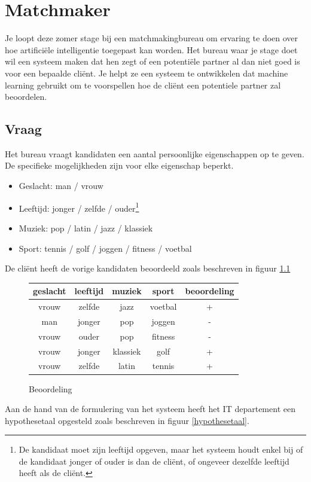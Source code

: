 \documentclass[alternative-exam.tex]{subfiles}
\begin{document}
\chapter{Matchmaker}
Je loopt deze zomer stage bij een matchmakingbureau om ervaring te doen over hoe artifici\"ele intelligentie toegepast kan worden.
Het bureau waar je stage doet wil een systeem maken dat hen zegt of een potenti\"ele partner al dan niet goed is voor een bepaalde cli\"ent. Je helpt ze een systeem te ontwikkelen dat machine learning gebruikt om te voorspellen hoe de cli\"ent een potentiele partner zal beoordelen.

\section{Vraag}
Het bureau vraagt kandidaten een aantal persoonlijke eigenschappen op te geven.
De specifieke mogelijkheden zijn voor elke eigenschap beperkt.
\begin{itemize}
\item Geslacht: man / vrouw
\item Leeftijd: jonger / zelfde / ouder\footnote{De kandidaat moet zijn leeftijd opgeven, maar het systeem houdt enkel bij of de kandidaat jonger of ouder is dan de cli\"ent, of ongeveer dezelfde leeftijd heeft als de cli\"ent.}
\item Muziek: pop / latin / jazz  / klassiek
\item Sport: tennis / golf / joggen / fitness / voetbal
\end{itemize}
De cli\"ent heeft de vorige kandidaten beoordeeld zoals beschreven in figuur \ref{beoordeling}
\begin{figure}[H]
\centering
\caption{Beoordeling}
\label{beoordeling}
\begin{tabular}{|c|c|c|c|c|}
\hline
geslacht & leeftijd & muziek & sport & beoordeling\\
\hline
vrouw & zelfde & jazz & voetbal & +\\
man & jonger & pop & joggen & -\\%
vrouw & ouder & pop & fitness & -\\
vrouw & jonger & klassiek & golf & +\\
vrouw & zelfde & latin & tennis & +\\
\hline
\end{tabular}
\end{figure}
Aan de hand van de formulering van het systeem heeft het IT departement een hypothesetaal opgesteld zoals beschreven in figuur \ref{hypothesetaal}.
\end{document}
